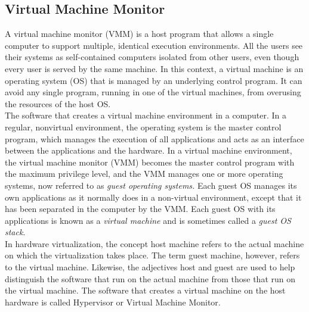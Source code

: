 \subsection{Virtual Machine Monitor}
A virtual machine monitor (VMM) is a host program that allows a single computer to support multiple, identical execution environments. All the users see 
their systems as self-contained computers isolated from other users, even though every user is served by the same machine. In this context, a virtual 
machine is an operating system (OS) that is managed by an underlying control program. It can avoid any single program, running in one of the virtual machines, 
from overusing the resources of the host OS.\\
The software that creates a virtual machine environment in a computer. In a regular, nonvirtual environment, the operating system is the master control 
program, which manages the execution of all applications and acts as an interface between the applications and the hardware. In a virtual machine environment, 
the virtual machine monitor (VMM) becomes the master control program with the maximum privilege level, and the VMM manages one or more operating systems, 
now referred to as \emph{guest operating systems.} Each guest OS manages its own applications as it normally does in a non-virtual environment, except that 
it has been separated in the computer by the VMM. Each guest OS with its applications is known as a \emph{virtual machine} and is sometimes called a 
\emph{guest OS stack}.\\
In hardware virtualization, the concept host machine refers to the actual machine on which the virtualization takes place. The term guest machine, however, 
refers to the virtual machine. Likewise, the adjectives host and guest are used to help distinguish the software that run on the actual machine from those 
that run on the virtual machine. The software that creates a virtual machine on the host hardware is called Hypervisor or Virtual Machine Monitor.\\